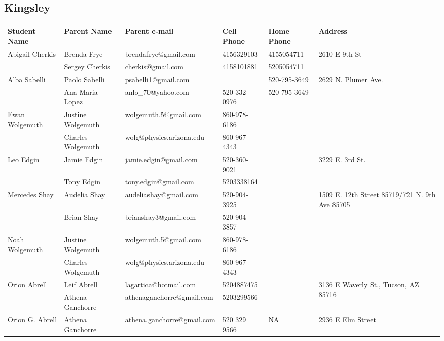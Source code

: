 \documentclass[landscape]{article}\usepackage[]{graphicx}\usepackage[]{color}
\begin{document}
\subsection{Kingsley}
\begin{longtable}{|p{100pt}|p{100pt}|p{140pt}|p{60pt}|p{64pt}|p{120pt}|}
\textbf{Student Name} & \textbf{Parent Name} & \textbf{Parent e-mail} & \textbf{Cell Phone} & \textbf{Home Phone} & \textbf{Address}\\
\hline
\hline
\multirow{2}{100pt}{Abigail Cherkis} & Brenda Frye & brendafrye@gmail.com & 4156329103 & 4155054711 & \multirow{2}{120pt}{2610 E 9th St} \\
 & Sergey Cherkis & cherkis@gmail.com & 4158101881 & 5205054711 & \\
\hline
\multirow{2}{100pt}{Alba Sabelli} & Paolo Sabelli & psabelli1@gmail.com &  & 520-795-3649 & \multirow{2}{120pt}{2629 N. Plumer Ave.} \\
 & Ana Maria Lopez & anlo\_70@yahoo.com & 520-332-0976 & 520-795-3649 & \\
\hline
\multirow{2}{100pt}{Ewan Wolgemuth} & Justine Wolgemuth & wolgemuth.5@gmail.com & 860-978-6186 &  & \multirow{2}{120pt}{} \\
 & Charles Wolgemuth & wolg@physics.arizona.edu & 860-967-4343 &  & \\
\hline
\multirow{2}{100pt}{Leo Edgin} & Jamie Edgin & jamie.edgin@gmail.com & 520-360-9021 &  & \multirow{2}{120pt}{3229 E. 3rd St.} \\
 & Tony Edgin & tony.edgin@gmail.com & 5203338164 &  & \\
\hline
\multirow{2}{100pt}{Mercedes Shay} & Audelia Shay  & audeliashay@gmail.com & 520-904-3925 &  & \multirow{2}{120pt}{1509 E. 12th Street 85719/721 N. 9th Ave 85705} \\
 & Brian Shay & brianshay3@gmail.com & 520-904-3857 &  & \\
\hline
\multirow{2}{100pt}{Noah Wolgemuth} & Justine Wolgemuth & wolgemuth.5@gmail.com & 860-978-6186 &  & \multirow{2}{120pt}{} \\
 & Charles Wolgemuth & wolg@physics.arizona.edu & 860-967-4343 &  & \\
\hline
\multirow{2}{100pt}{Orion Abrell} & Leif Abrell & lagartica@hotmail.com & 5204887475 &  & \multirow{2}{120pt}{3136 E Waverly St., Tucson, AZ 85716} \\
 & Athena Ganchorre & athenaganchorre@gmail.com & 5203299566 &  & \\
\hline
\multirow{2}{100pt}{Orion G. Abrell} & Athena Ganchorre & athena.ganchorre@gmail.com & 520 329 9566 & NA & \multirow{2}{120pt}{2936 E Elm Street} \\

\end{longtable}
\end{document}
